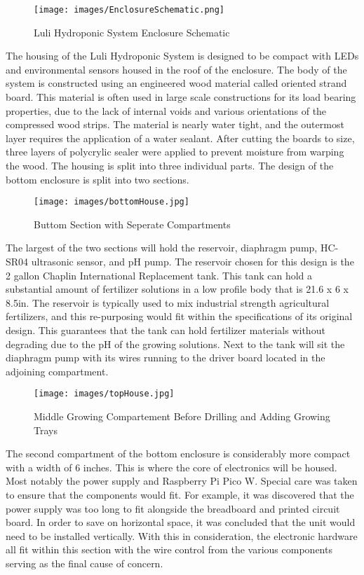 \documentclass[12pt]{article} %
\begin{document}
\begin{figure}[H]
    \centering
    \texttt{[image: images/EnclosureSchematic.png]}
    \caption{Luli Hydroponic System Enclosure Schematic}
    \label{fig: housing schematic}
\end{figure}

\noindent The housing of the Luli Hydroponic System is designed to be compact with LEDs and environmental sensors housed in the roof of the enclosure. The body of the system is constructed using an engineered wood material called oriented strand board. This material is often used in large scale constructions for its load bearing properties, due to the lack of internal voids and various orientations of the compressed wood strips. The material is nearly water tight, and the outermost layer requires the application of a water sealant. After cutting the boards to size, three layers of polycrylic sealer were applied to prevent moisture from warping the wood. The housing is split into three individual parts. The design of the bottom enclosure is split into two sections. 

\begin{figure}[H]
    \centering
    \texttt{[image: images/bottomHouse.jpg]}
    \caption{Buttom Section with Seperate Compartments}
    \label{fig:bottom compartment}
\end{figure}
\pagebreak
\noindent The largest of the two sections will hold the reservoir, diaphragm pump, HC-SR04 ultrasonic sensor, and pH pump. The reservoir chosen for this design is the 2 gallon Chaplin International Replacement tank. This tank can hold a substantial amount of fertilizer solutions in a low profile body that is 21.6 x 6 x 8.5in. The reservoir is typically used to mix industrial strength agricultural fertilizers, and this re-purposing would fit within the specifications of its original design. This guarantees that the tank can hold fertilizer materials without degrading due to the pH of the growing solutions. Next to the tank will sit the diaphragm pump with its wires running to the driver board located in the adjoining compartment.

\begin{figure}[H]
    \centering
    \texttt{[image: images/topHouse.jpg]}
    \caption{Middle Growing Compartement Before Drilling and Adding Growing Trays}
    \label{fig:mid Housing}
\end{figure}

\noindent The second compartment of the bottom enclosure is considerably more compact with a width of 6 inches. This is where the core of electronics will be housed. Most notably the power supply and Raspberry Pi Pico W. Special care was taken to ensure that the components would fit. For example, it was discovered that the power supply was too long to fit alongside the breadboard and printed circuit board. In order to save on horizontal space, it was concluded that the unit would need to be installed vertically. With this in consideration, the electronic hardware all fit within this section with the wire control from the various components serving as the final cause of concern.
\end{document}
